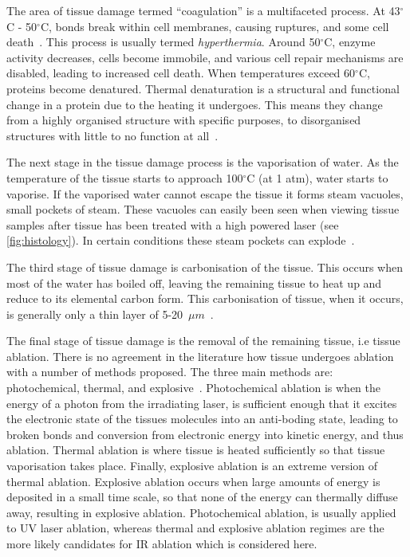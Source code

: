 The area of tissue damage termed ``coagulation'' is a multifaceted process. At 43$^{\circ}$C - 50$^{\circ}$C, bonds break within cell membranes, causing ruptures, and some cell death~\cite{welch2011optical,wright2015quantitative}. This process is usually termed \textit{hyperthermia}. Around 50$^{\circ}$C, enzyme activity decreases, cells become immobile, and various cell repair mechanisms are disabled, leading to increased cell death. When temperatures exceed 60$^{\circ}$C, proteins become denatured. Thermal denaturation is a structural and functional change in a protein due to the heating it undergoes. This means they change from a highly organised structure with specific purposes, to disorganised structures with little to no function at all~\cite{niemz2013laser}.  %

The next stage in the tissue damage process is the vaporisation of water. As the temperature of the tissue starts to approach 100${^{\circ}}$C (at 1 atm), water starts to vaporise. If the vaporised water cannot escape the tissue it forms steam vacuoles, small pockets of steam. These vacuoles can easily been seen when viewing tissue samples after tissue has been treated with a high powered laser (see \cref{fig:histology}). In certain conditions these steam pockets can explode~\cite{petrella2013popcorn}.


The third stage of tissue damage is carbonisation of the tissue. This occurs when most of the water has boiled off, leaving the remaining tissue to heat up and reduce to its elemental carbon form. This carbonisation of tissue, when it occurs, is generally only a thin layer of 5-20~$\mu m$~\cite{welch2011optical,verdaasdonk1990explosive}.

The final stage of tissue damage is the removal of the remaining tissue, i.e tissue ablation. There is no agreement in the literature how tissue undergoes ablation with a number of methods proposed. The three main methods are: photochemical, thermal, and explosive~\cite{husinsky1990mechanisms,kitai1991physics,oraevsky1991pulsed}. 
Photochemical ablation is when the energy of a photon from the irradiating laser, is sufficient enough that it excites the electronic state of the tissues molecules into an anti-boding state, leading to broken bonds and conversion from electronic energy into kinetic energy, and thus ablation.
Thermal ablation is where tissue is heated sufficiently so that tissue vaporisation takes place. 
Finally, explosive ablation is an extreme version of thermal ablation. Explosive ablation occurs when large amounts of energy is deposited in a small time scale, so that none of the energy can thermally diffuse away, resulting in explosive ablation.
Photochemical ablation, is usually applied to UV laser ablation, whereas thermal and explosive ablation regimes are the more likely candidates for IR ablation which is considered here.

